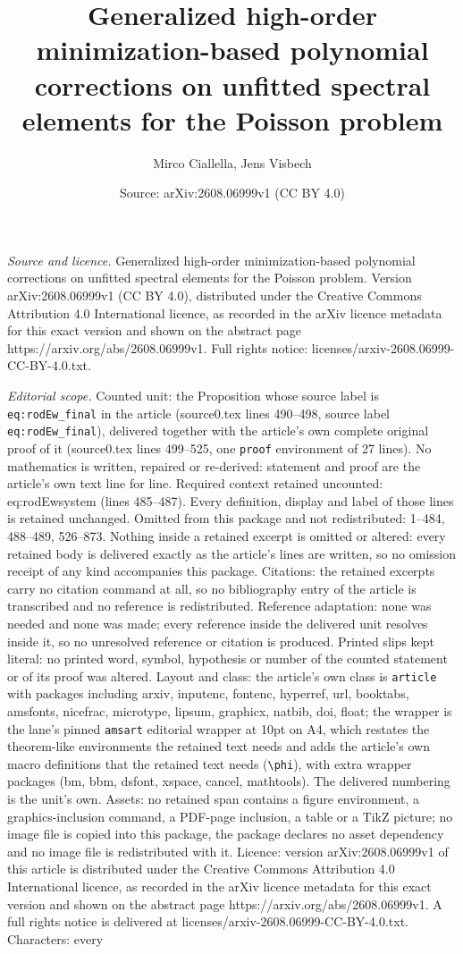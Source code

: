\documentclass[10pt,a4paper]{amsart}
\title[Generalized high-order minimization-based polynomial correct]{Generalized high-order minimization-based polynomial corrections on unfitted spectral elements for the Poisson problem}
\author{Mirco Ciallella, Jens Visbech}
\date{Source: arXiv:2608.06999v1 (CC BY 4.0)}
\begin{document}
\maketitle

\noindent\emph{Source and licence.} Generalized high-order minimization-based polynomial corrections on unfitted spectral elements for the Poisson problem. Version arXiv:2608.06999v1 (CC BY 4.0), distributed under the Creative Commons Attribution 4.0 International licence, as recorded in the arXiv licence metadata for this exact version and shown on the abstract page https://arxiv.org/abs/2608.06999v1. Full rights notice: licenses/arxiv-2608.06999-CC-BY-4.0.txt.\par\smallskip

\noindent\textit{Editorial scope.} Counted unit: the Proposition whose source label is \texttt{eq:rodEw\_final} in the article (source0.tex lines 490--498, source label \texttt{eq:rodEw\_final}), delivered together with the article's own complete original proof of it (source0.tex lines 499--525, one \texttt{proof} environment of 27 lines). No mathematics is written, repaired or re-derived: statement and proof are the article's own text line for line. Required context retained uncounted: eq:rodEwsystem (lines 485--487). Every definition, display and label of those lines is retained unchanged. Omitted from this package and not redistributed: 1--484, 488--489, 526--873. Nothing inside a retained excerpt is omitted or altered: every retained body is delivered exactly as the article's lines are written, so no omission receipt of any kind accompanies this package. Citations: the retained excerpts carry no citation command at all, so no bibliography entry of the article is transcribed and no reference is redistributed. Reference adaptation: none was needed and none was made; every reference inside the delivered unit resolves inside it, so no unresolved reference or citation is produced. Printed slips kept literal: no printed word, symbol, hypothesis or number of the counted statement or of its proof was altered. Layout and class: the article's own class is \texttt{article} with packages including arxiv, inputenc, fontenc, hyperref, url, booktabs, amsfonts, nicefrac, microtype, lipsum, graphicx, natbib, doi, float; the wrapper is the lane's pinned \texttt{amsart} editorial wrapper at 10pt on A4, which restates the theorem-like environments the retained text needs and adds the article's own macro definitions that the retained text needs (\texttt{\textbackslash phi}), with extra wrapper packages (bm, bbm, dsfont, xspace, cancel, mathtools). The delivered numbering is the unit's own. Assets: no retained span contains a figure environment, a graphics-inclusion command, a PDF-page inclusion, a table or a TikZ picture; no image file is copied into this package, the package declares no asset dependency and no image file is redistributed with it. Licence: version arXiv:2608.06999v1 of this article is distributed under the Creative Commons Attribution 4.0 International licence, as recorded in the arXiv licence metadata for this exact version and shown on the abstract page https://arxiv.org/abs/2608.06999v1. A full rights notice is delivered at licenses/arxiv-2608.06999-CC-BY-4.0.txt. Characters: every 
\end{document}
